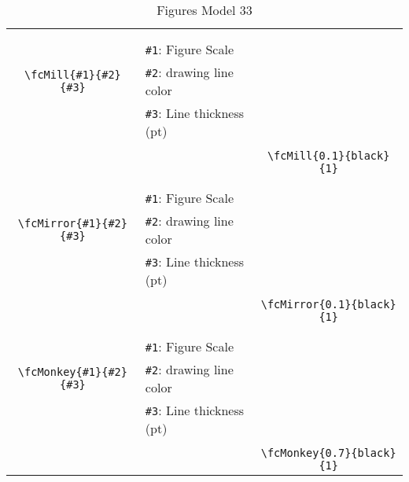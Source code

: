 \documentclass[x11names]{article}
\begin{document}
\begin{table}[H]
\begin{tabular}{|c|l|c|}
	&&\multirow{5}{*}{\fcMill{0.1}{black}{1}}\\	&&\\	&\verb|#1|: Figure Scale &\\	\verb|\fcMill{#1}{#2}{#3}|&	\verb|#2|: drawing line color &\\	&\verb|#3|: Line thickness (pt) &\\ &&\\&&	\verb|\fcMill{0.1}{black}{1}|\\\hline 	
	&&\multirow{5}{*}{\fcMirror{0.1}{black}{1}}\\	&&\\	&\verb|#1|: Figure Scale &\\	\verb|\fcMirror{#1}{#2}{#3}|&	\verb|#2|: drawing line color &\\	&\verb|#3|: Line thickness (pt) &\\ &&\\&&	\verb|\fcMirror{0.1}{black}{1}|\\\hline 	
	&&\multirow{5}{*}{\fcMonkey{0.7}{black}{1}}\\	&&\\	&\verb|#1|: Figure Scale &\\	\verb|\fcMonkey{#1}{#2}{#3}|&	\verb|#2|: drawing line color &\\	&\verb|#3|: Line thickness (pt) &\\ &&\\&&	\verb|\fcMonkey{0.7}{black}{1}|\\\hline 	\hline\end{tabular}\caption{Figures Model 33}\label{tab33}\end{table}
\end{document}
